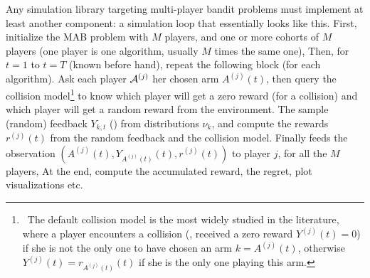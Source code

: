Any simulation library targeting multi-player bandit problems must implement at least another component:
a simulation loop that essentially looks like this.
    First, initialize the MAB problem with $M$ players, and one or more cohorts of $M$ players (one player is one algorithm, usually $M$ times the same one),
    Then, for $t=1$ to $t=T$ (known before hand), repeat the following block (for each algorithm). Ask each player $\mathcal{A}^{(j)}$ her chosen arm $A^{(j)}(t)$, then query the collision model\footnote{~The default collision model is the most widely studied in the literature, where a player encounters a collision (\ie, received a zero reward $Y^{(j)}(t)=0$) if she is not the only one to have chosen an arm $k=A^{(j)}(t)$, otherwise $Y^{(j)}(t)=r_{A^{(j)}(t)}(t)$ if she is the only one playing this arm.} to know which player will get a zero reward (for a collision) and which player will get a random reward from the environment. The
    sample (random) feedback $Y_{k,t}$ (\iid) from distributions $\nu_{k}$, and compute the rewards $r^{(j)}(t)$ from the random feedback and the collision model. Finally feeds the observation $(A^{(j)}(t), Y_{A^{(j)}(t)}(t), r^{(j)}(t))$ to player $j$, for all the $M$ players,
    At the end, compute the accumulated reward, the regret, plot visualizations etc.


